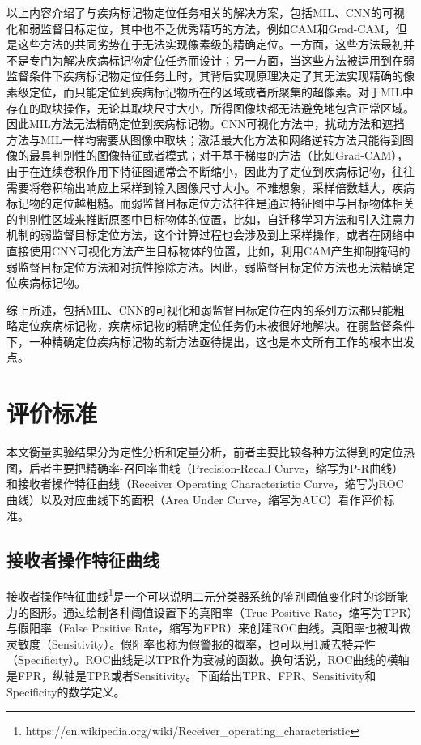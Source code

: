 以上内容介绍了与疾病标记物定位任务相关的解决方案，包括MIL、CNN的可视化和弱监督目标定位，其中也不乏优秀精巧的方法，例如CAM和Grad-CAM，但是这些方法的共同劣势在于无法实现像素级的精确定位。一方面，这些方法最初并不是专门为解决疾病标记物定位任务而设计；另一方面，当这些方法被运用到在弱监督条件下疾病标记物定位任务上时，其背后实现原理决定了其无法实现精确的像素级定位，而只能定位到疾病标记物所在的区域或者所聚集的超像素。对于MIL中存在的取块操作，无论其取块尺寸大小，所得图像块都无法避免地包含正常区域。因此MIL方法无法精确定位到疾病标记物。CNN可视化方法中，扰动方法和遮挡方法与MIL一样均需要从图像中取块；激活最大化方法和网络逆转方法只能得到图像的最具判别性的图像特征或者模式；对于基于梯度的方法（比如Grad-CAM），由于在连续卷积作用下特征图通常会不断缩小，因此为了定位到疾病标记物，往往需要将卷积输出响应上采样到输入图像尺寸大小。不难想象，采样倍数越大，疾病标记物的定位越粗糙。而弱监督目标定位方法往往是通过特征图中与目标物体相关的判别性区域来推断原图中目标物体的位置，比如，自迁移学习方法和引入注意力机制的弱监督目标定位方法，这个计算过程也会涉及到上采样操作，或者在网络中直接使用CNN可视化方法产生目标物体的位置，比如，利用CAM产生抑制掩码的弱监督目标定位方法和对抗性擦除方法。因此，弱监督目标定位方法也无法精确定位疾病标记物。

综上所述，包括MIL、CNN的可视化和弱监督目标定位在内的系列方法都只能粗略定位疾病标记物，疾病标记物的精确定位任务仍未被很好地解决。在弱监督条件下，一种精确定位疾病标记物的新方法亟待提出，这也是本文所有工作的根本出发点。
\vspace{-0.3cm}
\section{评价标准}\label{sec:evaluation_metrics}
本文衡量实验结果分为定性分析和定量分析，前者主要比较各种方法得到的定位热图，后者主要把精确率-召回率曲线（Precision-Recall Curve，缩写为P-R曲线）和接收者操作特征曲线（Receiver Operating Characteristic Curve，缩写为ROC曲线）以及对应曲线下的面积（Area Under Curve，缩写为AUC）看作评价标准。
\subsection{接收者操作特征曲线}\label{subsec:roc_curve}
接收者操作特征曲线\footnote{https://en.wikipedia.org/wiki/Receiver\_operating\_characteristic}是一个可以说明二元分类器系统的鉴别阈值变化时的诊断能力的图形。通过绘制各种阈值设置下的真阳率（True Positive Rate，缩写为TPR）与假阳率（False Positive Rate，缩写为FPR）来创建ROC曲线。真阳率也被叫做灵敏度（Sensitivity）。假阳率也称为假警报的概率，也可以用1减去特异性（Specificity）。ROC曲线是以TPR作为衰减的函数。换句话说，ROC曲线的横轴是FPR，纵轴是TPR或者Sensitivity。下面给出TPR、FPR、Sensitivity和Specificity的数学定义。

